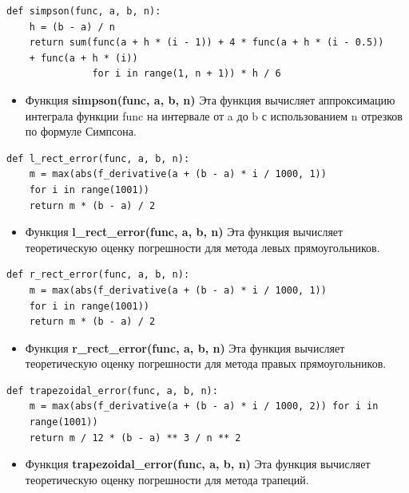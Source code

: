 \documentclass{article}
\begin{document}
\begin{lstlisting}
def simpson(func, a, b, n):
    h = (b - a) / n
    return sum(func(a + h * (i - 1)) + 4 * func(a + h * (i - 0.5))
    + func(a + h * (i))
               for i in range(1, n + 1)) * h / 6
\end{lstlisting}

\begin{itemize}
\item Функция \textbf{simpson(func, a, b, n)} Эта функция вычисляет аппроксимацию интеграла функции func на интервале от a до b с использованием n отрезков по формуле Симпсона.
\end{itemize}


\begin{lstlisting}
def l_rect_error(func, a, b, n):
    m = max(abs(f_derivative(a + (b - a) * i / 1000, 1))
    for i in range(1001))
    return m * (b - a) / 2
\end{lstlisting}

\begin{itemize}
\item Функция \textbf{l\_rect\_error(func, a, b, n)} Эта функция вычисляет теоретическую оценку погрешности для метода левых прямоугольников.
\end{itemize}

\begin{lstlisting}
def r_rect_error(func, a, b, n):
    m = max(abs(f_derivative(a + (b - a) * i / 1000, 1)) 
    for i in range(1001))
    return m * (b - a) / 2
\end{lstlisting}

\begin{itemize}
\item Функция \textbf{r\_rect\_error(func, a, b, n)} Эта функция вычисляет теоретическую оценку погрешности для метода правых прямоугольников.
\end{itemize}

\begin{lstlisting}
def trapezoidal_error(func, a, b, n):
    m = max(abs(f_derivative(a + (b - a) * i / 1000, 2)) for i in
    range(1001))
    return m / 12 * (b - a) ** 3 / n ** 2
\end{lstlisting}

\begin{itemize}
\item Функция \textbf{trapezoidal\_error(func, a, b, n)} Эта функция вычисляет теоретическую оценку погрешности для метода трапеций.
\end{itemize}
\end{document}
